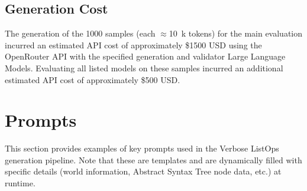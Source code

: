 \documentclass{article}
\begin{document}
\subsection{Generation Cost}
The generation of the 1000 samples (each $\approx$\SI{10}{k} tokens) for the main evaluation incurred an estimated API cost of approximately \$1500 USD using the OpenRouter API with the specified generation and validator Large Language Models. Evaluating all listed models on these samples incurred an additional estimated API cost of approximately \$500 USD.



\section{Prompts}
\label{app:prompts}
This section provides examples of key prompts used in the Verbose ListOps generation pipeline. Note that these are templates and are dynamically filled with specific details (world information, Abstract Syntax Tree node data, etc.) at runtime.
\end{document}
